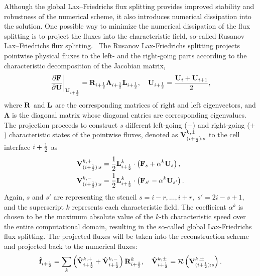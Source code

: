 Although the global Lax–Friedrichs flux splitting provides improved stability and robustness
of the numerical scheme, it also introduces numerical dissipation into the solution.
One possible way to minimize the numerical dissipation of the flux splitting is to project
the fluxes into the characteristic field, so-called Rusanov Lax–Friedrichs flux splitting.~\cite{vcrnjaric2006different,mignone2010high}
The Rusanov Lax-Friedrichs splitting projects pointwise physical fluxes
to the left- and the right-going parts according to the characteristic decomposition of the Jacobian matrix,
\begin{equation}\label{eq:jacobian_iph}
    \left. \frac{\partial \mathbf{F}}{\partial \mathbf{U}}\right|_{\mathbf{U}_{{i+\frac{1}{2}}}}=
        \mathbf{R}_{{i+\frac{1}{2}}} \mathbf{\Lambda}_{{i+\frac{1}{2}}} \mathbf{L}_{{i+\frac{1}{2}}}, \quad
        \mathbf{U}_{{i+\frac{1}{2}}} = \frac{\mathbf{U}_{i} + \mathbf{U}_{i+1}}{2},
\end{equation}
where \( \mathbf{R} \) and \( \mathbf{L} \) are the corresponding matrices of right and left eigenvectors,
and \( \mathbf{\Lambda} \) is the diagonal matrix whose diagonal entries are corresponding eigenvalues.
The projection proceeds to construct \( s \) different left-going (\( - \)) and right-going (\( + \)) characteristic
states of the pointwise fluxes, denoted as \( \mathbf{V}^{k, \pm}_{(i+\frac{1}{2}):{s}} \)
to the cell interface \( i + \frac{1}{2} \) as
\begin{equation}\label{eq:rus_lf_splitting}
    \begin{split}
        \mathbf{V}^{k,+}_{(i+\frac{1}{2}):{s}}
            &= \frac{1}{2} \mathbf{L}_{i+\frac{1}{2}}^{k} \cdot \left(\mathbf{F}_{s} + \alpha^k \mathbf{U}_{s} \right), \\
        \mathbf{V}^{k,-}_{(i+\frac{1}{2}):{s}}
            &= \frac{1}{2} \mathbf{L}_{i+\frac{1}{2}}^{k} \cdot \left(\mathbf{F}_{s'} - \alpha^k \mathbf{U}_{s'} \right).
    \end{split}
\end{equation}
Again, \( s \) and \( s' \) are representing the stencil
\( s = i-r, \dots, i+r, \; s' = 2i-s+1 \),
and the superscript \( k \) represents each characteristic field.
The coefficient \( \alpha^{k} \) is chosen to be the maximum absolute value of the
\( k \)-th characteristic speed over the entire computational domain,
resulting in the so-called global Lax-Friedrichs flux splitting.
The projected fluxes will be taken into the reconstruction scheme and projected back to the numerical fluxes:
\begin{equation}\label{eq:rus_lf_splitting_combine}
    \hat{\mathbf{f}}_{i+\frac{1}{2}}
        = \sum\limits_{k}\left( \hat{\mathbf{V}}_{i+\frac{1}{2}}^{k,+} + \hat{\mathbf{V}}_{i+\frac{1}{2}}^{k,-}\right) \mathbf{R}^{k}_{i+\frac{1}{2}},
    \quad
    \hat{\mathbf{V}}_{i+\frac{1}{2}}^{k,\pm} =
        \mathcal{R}\left(
            \mathbf{V}^{k,\pm}_{(i+\frac{1}{2}):{s}}
        \right).
\end{equation}


